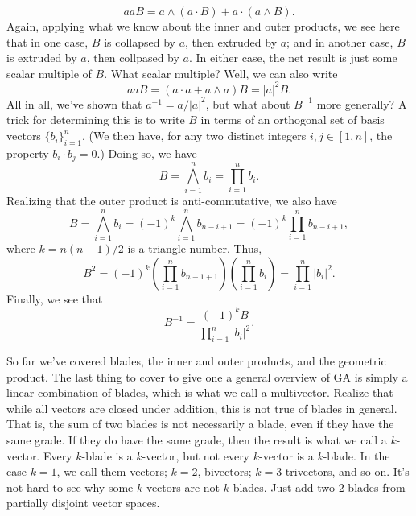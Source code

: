 \documentclass[12pt]{article}
\begin{document}
\begin{equation}
aaB = a\wedge(a\cdot B) + a\cdot(a\wedge B).
\end{equation}
Again, applying what we know about the inner and outer products, we see here that in one case,
$B$ is collapsed by $a$, then extruded by $a$; and in another case, $B$ is extruded by $a$, then
collpased by $a$.  In either case, the net result is just some scalar multiple of $B$.  What scalar multiple?
Well, we can also write
\begin{equation}
aaB = (a\cdot a + a\wedge a)B = |a|^2 B.
\end{equation}
All in all, we've shown that $a^{-1}=a/|a|^2$, but what about $B^{-1}$ more generally?
A trick for determining this is to write $B$ in terms of an orthogonal set of basis vectors $\{b_i\}_{i=1}^n$.
(We then have, for any two distinct integers $i,j\in[1,n]$, the property $b_i\cdot b_j=0$.)
Doing so, we have
\begin{equation}
B = \bigwedge_{i=1}^n b_i = \prod_{i=1}^n b_i.
\end{equation}
Realizing that the outer product is anti-commutative, we also have
\begin{equation}
B = \bigwedge_{i=1}^n b_i = (-1)^k\bigwedge_{i=1}^n b_{n-i+1} = (-1)^k\prod_{i=1}^n b_{n-i+1},
\end{equation}
where $k=n(n-1)/2$ is a triangle number.  Thus,
\begin{equation}
B^2 = (-1)^k\left(\prod_{i=1}^n b_{n-1+1}\right)\left(\prod_{i=1}^n b_i\right) = \prod_{i=1}^n |b_i|^2.
\end{equation}
Finally, we see that
\begin{equation}
B^{-1}=\frac{(-1)^kB}{\prod_{i=1}^n |b_i|^2}.
\end{equation}

So far we've covered blades, the inner and outer products, and the geometric product.  The last thing
to cover to give one a general overview of GA is simply a linear combination of blades, which is what
we call a multivector.  Realize that while all vectors are closed under addition, this is not true of blades
in general.  That is, the sum of two blades is not necessarily a blade, even if they have the same grade.
If they do have the same grade, then the result is what we call a $k$-vector.  Every $k$-blade is a
$k$-vector, but not every $k$-vector is a $k$-blade.  In the case $k=1$, we call them vectors; $k=2$,
bivectors; $k=3$ trivectors, and so on.  It's not hard to see why some $k$-vectors are not $k$-blades.
Just add two $2$-blades from partially disjoint vector spaces.
\end{document}
